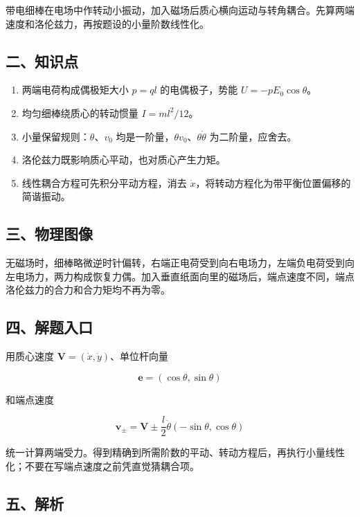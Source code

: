 \documentclass[12pt,a4paper,UTF8]{ctexart}
\newcommand{\tightlist}{\setlength{\itemsep}{0pt}\setlength{\parskip}{0pt}}
\begin{document}
带电细棒在电场中作转动小振动，加入磁场后质心横向运动与转角耦合。先算两端速度和洛伦兹力，再按题设的小量阶数线性化。

\subsection{二、知识点}\label{ux4e8cux77e5ux8bc6ux70b9-3}

\begin{enumerate}
\def\labelenumi{\arabic{enumi}.}
\tightlist
\item
  两端电荷构成偶极矩大小 \(p=ql\) 的电偶极子，势能
  \(U=-pE_0\cos\theta\)。
\item
  均匀细棒绕质心的转动惯量 \(I=ml^2/12\)。
\item
  小量保留规则：\(\theta\)、\(v_0\)
  均是一阶量，\(\theta v_0\)、\(\theta\dot\theta\) 为二阶量，应舍去。
\item
  洛伦兹力既影响质心平动，也对质心产生力矩。
\item
  线性耦合方程可先积分平动方程，消去
  \(\dot x\)，将转动方程化为带平衡位置偏移的简谐振动。
\end{enumerate}

\subsection{三、物理图像}\label{ux4e09ux7269ux7406ux56feux50cf-3}

无磁场时，细棒略微逆时针偏转，右端正电荷受到向右电场力，左端负电荷受到向左电场力，两力构成恢复力偶。加入垂直纸面向里的磁场后，端点速度不同，端点洛伦兹力的合力和合力矩均不再为零。

\subsection{四、解题入口}\label{ux56dbux89e3ux9898ux5165ux53e3-3}

用质心速度 \(\bm V=(\dot x,\dot y)\)、单位杆向量

\[\bm e=(\cos\theta,\sin\theta)\]

和端点速度

\[\bm v_\pm=\bm V\pm\frac l2\dot\theta(-\sin\theta,\cos\theta)\]

统一计算两端受力。得到精确到所需阶数的平动、转动方程后，再执行小量线性化；不要在写端点速度之前凭直觉猜耦合项。

\subsection{五、解析}\label{ux4e94ux89e3ux6790-3}
\end{document}
